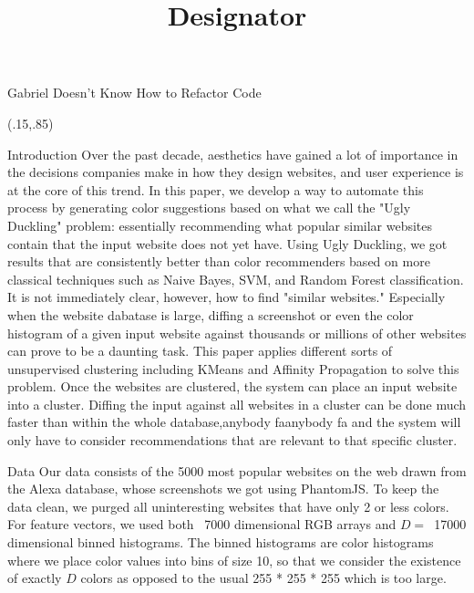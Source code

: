 \documentclass[7pt]{beamer}
\title[Designator]{Designator}
\begin{document}
\begin{frame}{\centerline{\Huge Gabriel Doesn't Know How to Refactor Code}}
\begin{textblock}{5}(.15,.85)
\begin{block}{Introduction}
Over the past decade, aesthetics have gained a lot of importance in the decisions companies
make in how they design websites, and user experience is at the core of this trend.  In this paper, we develop a way to automate this process by generating color suggestions based on what we call the "Ugly Duckling" problem: essentially recommending what popular similar websites contain that the input website does not yet have. Using Ugly Duckling, we got results that are consistently better than color recommenders based on more classical techniques such as Naive Bayes, SVM, and Random Forest classification. It is not immediately clear, however, how to find "similar websites." Especially when the website dabatase is large, diffing a screenshot or even the color histogram of a given input website against thousands or millions of other websites can prove to be a daunting task. This paper applies different sorts of unsupervised clustering including KMeans and Affinity Propagation to solve this problem. Once the websites are clustered, the system can place
an input website into a cluster. Diffing the input against all websites in a cluster can be
done much faster than within the whole database,anybody faanybody fa and the system will only have to consider
recommendations that are relevant to that specific cluster. 
\end{block}

\begin{block}{Data}
Our data consists of the 5000 most popular websites on the web drawn from the Alexa database, whose screenshots we got using PhantomJS. To keep the data clean, we purged all uninteresting websites that have only 2 or less colors. For feature vectors, we used both ~7000 dimensional RGB arrays and $D=$~17000 dimensional binned histograms. The binned histograms are color histograms where we place color values into bins of size 10, so that we consider the existence of exactly $D$ colors as opposed to the usual 255 * 255 * 255 which is too large.
\end{block}


\end{textblock}
\end{frame}
\end{document}
